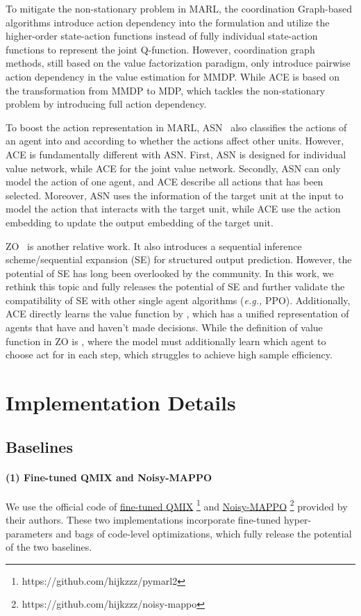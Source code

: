 \documentclass[letterpaper]{article} \usepackage{aaai23}  \usepackage{times}  \usepackage{helvet}  \usepackage{courier}  \usepackage[hyphens]{url}  \usepackage{graphicx} \urlstyle{rm} \def\UrlFont{\rm}  \usepackage{natbib}  \usepackage{caption} \frenchspacing  \setlength{\pdfpagewidth}{8.5in} \setlength{\pdfpageheight}{11in} \usepackage{algorithm}
\begin{document}
To mitigate the non-stationary problem in MARL, the coordination Graph-based algorithms introduce action dependency into the formulation and utilize the higher-order state-action functions instead of fully individual state-action functions to represent the joint Q-function. However, coordination graph methods, still based on the value factorization paradigm, only introduce pairwise action dependency in the value estimation for MMDP. While ACE is based on the transformation from MMDP to MDP, which tackles the non-stationary problem by introducing full action dependency. 

To boost the action representation in MARL, ASN~\citeyear{wang2019action} also classifies the actions of an agent into  and  according to whether the actions affect other units. However, ACE is fundamentally different with ASN. First, ASN is designed for individual value network, while ACE for the joint value network. Secondly, ASN can only model the action of one agent, and ACE describe all actions that has been selected. Moreover, ASN uses the information of the target unit at the input to model the action that interacts with the target unit, while ACE use the action embedding to update the output embedding of the target unit.

ZO~\citeyear{usunier2016episodic} is another relative work. It also introduces a sequential inference scheme/sequential expansion (SE) for structured output prediction. However, the potential of SE has long been overlooked by the community. In this work, we rethink this topic and fully releases the potential of SE and further validate the compatibility of SE with other single agent algorithms (\textit{e.g.,} PPO). Additionally, ACE directly learns the value function by , which has a unified representation of agents that have and haven't made decisions. While the definition of value function in ZO is , where the model must additionally learn which agent to choose act for in each step, which struggles to achieve high sample efficiency.



\section{Implementation Details}
\label{sec: details}
\subsection{Baselines}
\paragraph{(1) Fine-tuned QMIX\citeyear{pymarl2} and Noisy-MAPPO\citeyear{noisy_mappo}}
We use the official code of \href{https://github.com/hijkzzz/pymarl2}{fine-tuned QMIX} \footnote{https://github.com/hijkzzz/pymarl2} and \href{https://github.com/hijkzzz/noisy-mappo}{Noisy-MAPPO} \footnote{https://github.com/hijkzzz/noisy-mappo} provided by their authors. These two implementations incorporate fine-tuned hyper-parameters and bags of code-level optimizations, which fully release the potential of the two baselines.
\end{document}
